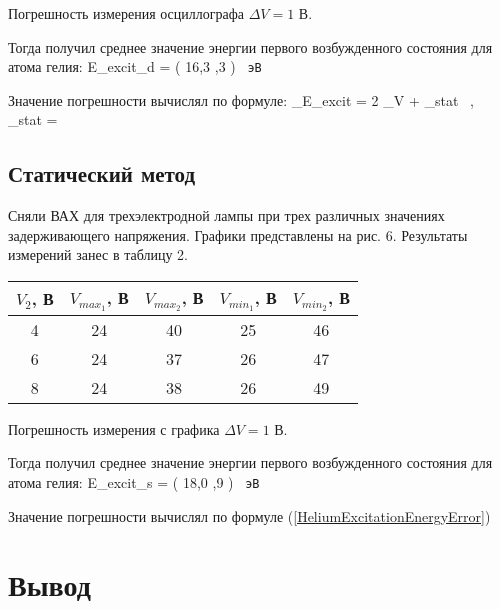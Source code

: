 Погрешность измерения осциллографа $ \Delta V = 1 $ В.

\newpage

Тогда получил среднее значение энергии первого возбужденного состояния для атома гелия:
{\langle E_{excit_d} \rangle = \left( 16,3 ,3 \right) \, \texttt{эВ}}

Значение погрешности вычислял по формуле:
{
    \sigma_{E_{excit}} = 2 \sigma_V + \sigma_{stat} \, , \,
    \sigma_{stat} = 
}

\subsection{Статический метод}

Сняли ВАХ для трехэлектродной лампы при трех различных значениях задерживающего напряжения.
Графики представлены на рис. 6. Результаты измерений занес в таблицу 2.


\begin{table}[h!]
    \begin{center}
        \begin{tabular}{|c|c|c|c|c|}
        \hline
        $ V_2 $, В & $ V_{max_1} $, В & $ V_{max_2} $, В & $ V_{min_1} $, В & $ V_{min_2} $, В  \\ \hline
        4 & 24 & 40 & 25 & 46 \\ \hline
        6 & 24 & 37 & 26 & 47 \\ \hline
        8 & 24 & 38 & 26 & 49 \\ \hline
        \end{tabular}
    \end{center}
\end{table}

Погрешность измерения с графика $ \Delta V = 1 $ В.

Тогда получил среднее значение энергии первого возбужденного состояния для атома гелия:
{\langle E_{excit_s} \rangle = \left( 18,0 ,9 \right) \, \texttt{эВ}}

Значение погрешности вычислял по формуле (\ref{HeliumExcitationEnergyError})

\newpage

\section{Вывод}

